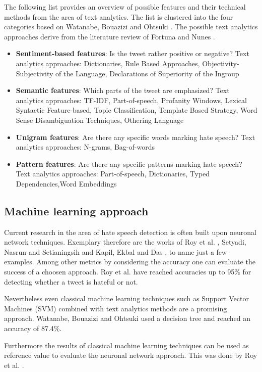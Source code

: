 The following list provides an overview of possible features and their technical methods from the area of text analytics. The list is clustered into the four categories based on Watanabe, Bouazizi and Ohtsuki \cite{8292838}. The possible text analytics approaches derive from the literature review of Fortuna and Nunes \cite{10.1145/3232676}.
\begin{itemize}
	\item \textbf{Sentiment-based features}: Is the tweet rather positive or negative? \newline
	Text analytics approaches: Dictionaries, Rule Based Approaches, Ob\-jec\-ti\-vi\-ty-Subjectivity of the Language, Declarations of Superiority of the Ingroup \cite{10.1145/3232676}
	\item \textbf{Semantic features}: Which parts of the tweet are emphasized? \newline
	Text analytics approaches: TF-IDF, Part-of-speech, Profanity Windows, Lexical Syntactic Feature-based, Topic Classification, Template Based Strategy, Word Sense Disambiguation Techniques, Othering Language \cite{10.1145/3232676}
	\item \textbf{Unigram features}: Are there any specific words marking hate speech? \newline
	Text analytics approaches: N-grams, Bag-of-words \cite{10.1145/3232676}
	\item \textbf{Pattern features}: Are there any specific patterns marking hate speech? \newline
	Text analytics approaches: Part-of-speech, Dictionaries, Typed De\-pen\-den\-cies,Word Embeddings \cite{10.1145/3232676}
\end{itemize}


\subsection{Machine learning approach}

Current research in the area of hate speech detection is often built upon neuronal network techniques. Exemplary therefore are the works of Roy et al. \cite{9253658}, Setyadi, Nasrun and Setianingsih \cite{8712109} and Kapil, Ekbal and Das \cite{kapil2020investigating}, to name just a few examples. Among other metrics by considering the accuracy one can evaluate the success of a choosen approach. Roy et al. \cite{9253658} have reached accuracies up to 95\% for detecting whether a tweet is hateful or not.

Nevertheless even classical machine learning techniques such as Support Vector Machines (SVM) combined with text analytics methods are a promis\-ing approach.
Watanabe, Bouazizi and Ohtsuki \cite{8292838} used a decision tree and reached an accuracy of 87.4\%.

Furthermore the results of classical machine learning techniques can be used as reference value to evaluate the neuronal network approach. This was done by Roy et al. \cite{9253658}.
